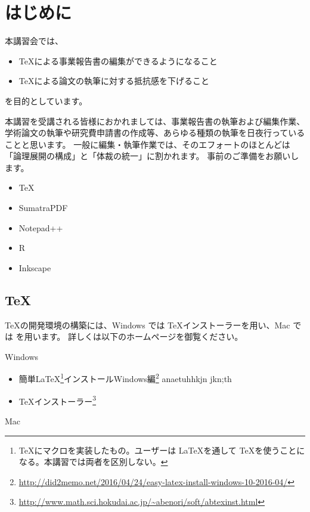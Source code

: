 \section{はじめに}

本講習会では、
\begin{itemize}
\item \TeX による事業報告書の編集ができるようになること
\item \TeX による論文の執筆に対する抵抗感を下げること
\end{itemize}
を目的としています。

本講習を受講される皆様におかれましては、事業報告書の執筆および編集作業、学術論文の執筆や研究費申請書の作成等、あらゆる種類の執筆を日夜行っていることと思います。
一般に編集・執筆作業では、そのエフォートのほとんどは「論理展開の構成」と「体裁の統一」に割かれます。
事前のご準備をお願いします。
\begin{itemize}
\item TeX
\item SumatraPDF
\item Notepad++
\item R
\item Inkscape
\end{itemize}

\subsection*{TeX}
\TeX の開発環境の構築には、Windows では \TeX インストーラーを用い、Mac では  を用います。
詳しくは以下のホームページを御覧ください。


\noindent Windows

\begin{itemize}
\item 簡単\LaTeX\footnote{\TeX にマクロを実装したもの。ユーザーは \LaTeX を通して \TeX を使うことになる。本講習では両者を区別しない。}インストールWindows編\footnote{\url{http://did2memo.net/2016/04/24/easy-latex-install-windows-10-2016-04/}}
  anaetuhhkjn
    jkn;th

\item \TeX インストーラー\footnote{\url{http://www.math.sci.hokudai.ac.jp/~abenori/soft/abtexinst.html}}
\end{itemize}



\noindent Mac




